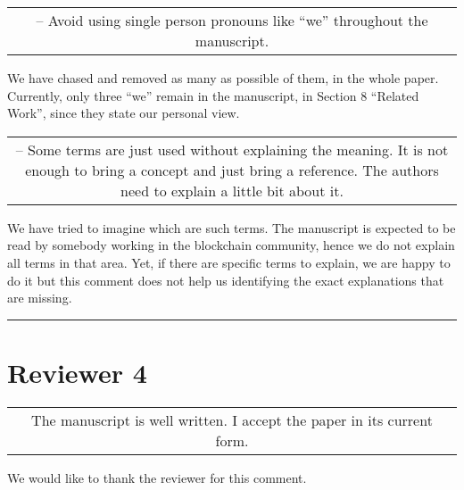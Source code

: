 \documentclass[journal,onecolumn, 11pt]{IEEEtran}
\newcommand{\BOX}[1]
{
  {\it
    \begin{center}
      \begin{tabular}{|c|}
        \hline
        \parbox{0.97\columnwidth}{
          \medskip
          #1
          \medskip} \\
        \hline
      \end{tabular}
    \end{center}
  }
}
\begin{document}
\BOX{9 -- Avoid using single person pronouns like ``we'' throughout the manuscript.} We have chased and removed as many as possible of them, in the whole paper. Currently, only three ``we'' remain in the manuscript, in Section 8 ``Related Work'', since they state our personal view.

\BOX{10 -- Some terms are just used without explaining the meaning. It is not enough to bring a concept and just bring a reference. The authors need to explain a little bit about it.}

We have tried to imagine which are such terms. The manuscript is expected to be read by somebody working in the blockchain community, hence we do not explain all terms in that area. Yet, if there are specific terms to explain, we are happy to do it but this comment does not help us identifying the exact explanations that are missing.

\vspace{5mm}
\hrule
\section*{\textbf{Reviewer 4}}

\BOX{The manuscript is well written.  I accept the paper in its current form.
}

We would like to thank the reviewer for this comment.
\end{document}
